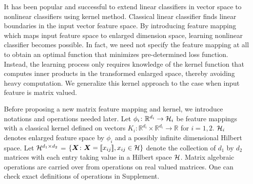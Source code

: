 \documentclass[mathptm]{statsoc}
\begin{document}
It has been popular and successful to extend linear classifiers in vector space to nonlinear classifiers using kernel method. Classical linear classifier finds linear boundaries in the input vector feature space. By introducing feature mapping which maps input feature space to enlarged dimension space, learning nonlinear classifier becomes possible. In fact, we need not specify the feature mapping at all to obtain an optimal function that minimizes pre-determined loss function. Instead, the learning process only requires knowledge of the kernel function that computes inner products in the transformed enlarged space, thereby avoiding heavy computation. We generalize this kernel approach to the case when input feature is matrix valued.


Before proposing a new matrix feature mapping and kernel, we introduce notations and operations needed later. Let $\phi_i\colon\mathbb{R}^{d_i}\rightarrow \mathcal{H}_i$ be feature mappings with a classical kernel defined on vectors $K_i\colon\mathbb{R}^{d_i}\times \mathbb{R}^{d_i}\rightarrow \mathbb{R}$ for $i = 1,2.$ $\mathcal{H}_i$ denotes enlarged feature space by $\phi_i$ and a possibly infinite dimensional Hilbert space.  Let $\mathcal{H}^{d_1\times d_2}$ = $\{\bm X\colon\bm X = \llbracket x_{ij} \rrbracket,x_{ij}\in\mathcal{H}\}$ denote the collection of $d_1$ by $d_2$ matrices with each entry taking value in a Hilbert space $\mathcal{H}$.   Matrix algebraic operations are carried over from operations on real valued matrices. One can check exact definitions of operations in Supplement.
\end{document}
